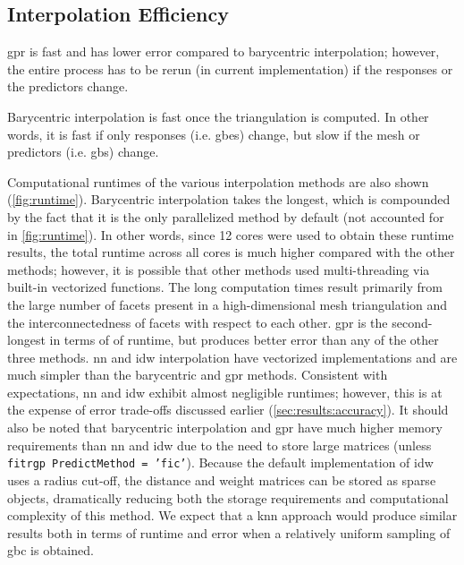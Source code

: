 \documentclass[preprint,12pt]{elsarticle}
\begin{document}
\subsection{Interpolation Efficiency}
\label{sec:results:efficiency}


\Gls{gpr} is fast and has lower error compared to barycentric interpolation; however, the entire process has to be rerun (in current implementation) if the responses or the predictors change.

Barycentric interpolation is fast once the triangulation is computed. In other words, it is fast if only responses (i.e. \glspl{gbe}) change, but slow if the mesh or predictors (i.e. \glspl{gb}) change.

Computational runtimes of the various interpolation methods are also shown (\cref{fig:runtime}). Barycentric interpolation takes the longest, which is compounded by the fact that it is the only parallelized method by default (not accounted for in \cref{fig:runtime}). In other words, since 12 cores were used to obtain these runtime results, the total runtime across all cores is much higher compared with the other methods; however, it is possible that other methods used multi-threading via built-in vectorized functions. The long computation times result primarily from the large number of facets present in a high-dimensional mesh triangulation and the interconnectedness of facets with respect to each other. \Gls{gpr} is the second-longest in terms of of runtime, but produces better error than any of the other three methods. \Gls{nn} and \gls{idw} interpolation have vectorized implementations and are much simpler than the barycentric and \gls{gpr} methods. Consistent with expectations, \gls{nn} and \gls{idw} exhibit almost negligible runtimes; however, this is at the expense of error trade-offs discussed earlier (\cref{sec:results:accuracy}). It should also be noted that barycentric interpolation and \gls{gpr} have much higher memory requirements than \gls{nn} and \gls{idw} due to the need to store large matrices (unless \texttt{fitrgp PredictMethod = 'fic'}). Because the default implementation of \gls{idw} uses a radius cut-off, the distance and weight matrices can be stored as sparse objects, dramatically reducing both the storage requirements and computational complexity of this method. We expect that a \gls{knn} approach would produce similar results both in terms of runtime and error when a relatively uniform sampling of \gls{gbc} is obtained.
\end{document}
